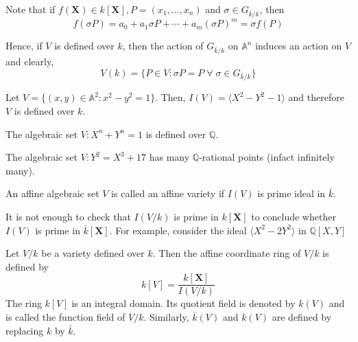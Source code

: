 \documentclass[oneside, 12pt]{scrbook}
\newcommand{\QQ}{\mathbb Q}
\newcommand{\Aa}{\mathbb{A}}
\theoremstyle{theorem}
\begin{document}
Note that if $f(\mathbf{X}) \in k[\mathbf{X}] , P =(x_{1}, \hdots , x_{n})$ and $\sigma \in G_{\bar{k}/k}$, then 
\begin{equation}
f(\sigma P) = a_{0} + a_{1} \sigma P + \cdots + a_{m} (\sigma P)^m = \sigma f(P)
\end{equation}

Hence, if $V$ is defined over $k$, then the action of $G_{\bar{k}/k}$ on $\Aa^n$ induces an action on $V$ and clearly, 
\begin{equation}
V(k) = \{P \in V : \sigma P = P \; \forall \; \sigma \in G_{\bar{k}/k}\}
\end{equation}

\begin{example}
Let $V= \{(x,y)\in \Aa^2 : x^2 -y^2=1\}$. Then, $I(V) = \langle X^2 - Y^2 -1 \rangle$ and therefore $V$ is defined over $k$. 
\end{example}

\begin{example}
The algebraic set $V: X^n + Y^n =1$ is defined over $\QQ$.
\end{example}

\begin{example}
The algebraic set $V: Y^2 = X^{3} + 17$ has many $\QQ$-rational points (infact infinitely many). 
\end{example}

\begin{definition}
An affine algebraic set $V$ is called an affine variety if $I(V)$ is prime ideal in $\bar{k}$. 
\end{definition}
\begin{remark}
It is not enough to check that $I(V/k)$ is prime in $k[\mathbf{X}]$ to conclude whether $I(V)$ is prime in $\bar{k}[\mathbf{X}]$. For example, consider the ideal $\langle X^2 - 2Y^2 \rangle $ in $\QQ[X,Y]$
\end{remark}

\begin{definition}
Let $V/k$ be a variety defined over $k$. Then the affine coordinate ring of $V/k$ is defined by 
\begin{equation}
k[V] = \frac{k[\mathbf{X}]}{I(V/k)}
\end{equation}
The ring $k[V]$ is an integral domain. Its quotient field is denoted by $k(V)$ and is called the function field of $V/k$. Similarly, $\bar{k}(V)$ and $k(V)$ are defined by replacing $k$ by $\bar{k}$.
\end{definition}
\end{document}
